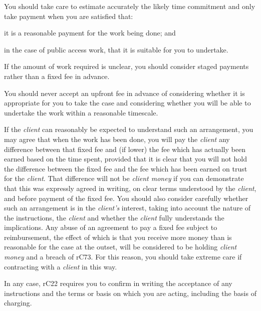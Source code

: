 \begin{dotlist}
 \item You should take care to estimate accurately the likely time commitment
and only take payment when you are satisfied that:
\begin{dashlist}
\item it is a reasonable payment for the work being done; and

\item in the case of public access work, that it is suitable for you to
undertake.
\end{dashlist}
\item If the amount of work required is unclear, you should consider staged
payments rather than a fixed fee in advance.

\item You should never accept an upfront fee in advance of considering
whether it is appropriate for you to take the case and considering
whether you will be able to undertake the work within a reasonable
timescale.

\item If the \emph{client} can reasonably be expected to understand such an
arrangement, you may agree that when the work has been done, you will
pay the \emph{client} any difference between that fixed fee and (if
lower) the fee which has actually been earned based on the time spent,
provided that it is clear that you will not hold the difference between
the fixed fee and the fee which has been earned on trust for the
\emph{client}. That difference will not be \emph{client money} if you
can demonstrate that this was expressly agreed in writing, on clear
terms understood by the \emph{client}, and before payment of the fixed
fee. You should also consider carefully whether such an arrangement is
in the \emph{client's} interest, taking into account the nature of the
instructions, the \emph{client} and whether the \emph{client} fully
understands the implications. Any abuse of an agreement to pay a fixed
fee subject to reimbursement, the effect of which is that you receive
more money than is reasonable for the case at the outset, will be
considered to be holding \emph{client money} and a breach of rC73. For
this reason, you should take extreme care if contracting with a
\emph{client} in this way.

\item In any case, rC22 requires you to confirm in writing the acceptance of
any instructions and the terms or basis on which you are acting,
including the basis of charging.
	
\end{dotlist}


